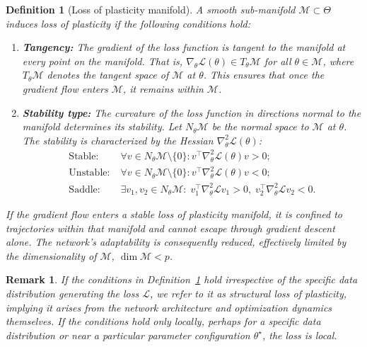 \documentclass{article}
\newcommand{\Loss}{\mathcal{L}}
\newtheorem{definition}{Definition}[section]
\newtheorem{remark}{Remark}[section]
\begin{document}
\begin{definition}[Loss of plasticity manifold]
\label{def:lop}
A smooth sub-manifold $\mathcal{M}\subset\Theta$ induces loss of plasticity if the following conditions hold:
\begin{enumerate}[label=(\alph*)]
    \item \textbf{Tangency:} The gradient of the loss function is tangent to the manifold at every point on the manifold. That is, $\nabla_\theta\Loss(\theta)\in T_\theta\mathcal{M}$ for all $\theta\in\mathcal{M}$, where $T_\theta\mathcal{M}$ denotes the tangent space of $\mathcal{M}$ at $\theta$. This ensures that once the gradient flow enters $\mathcal{M}$, it remains within $\mathcal{M}$.
    \item \textbf{Stability type:} The curvature of the loss function in directions normal to the manifold determines its stability. Let $N_\theta\mathcal{M}$ be the normal space to $\mathcal{M}$ at $\theta$. The stability is characterized by the Hessian $\nabla_\theta^2\Loss(\theta)$: \vspace{-4pt}
        \begin{align}
        \text{Stable:}\; &\forall v\in N_\theta\mathcal{M}\setminus\{0\}: v^\top\nabla_\theta^2\Loss(\theta)v > 0; \label{eq:stable}\\
        \text{Unstable:}\; &\forall v\in N_\theta\mathcal{M}\setminus\{0\}: v^\top\nabla_\theta^2\Loss(\theta)v < 0; \label{eq:unstable}\\
        \text{Saddle:}\; &\exists v_1,v_2\in N_\theta\mathcal{M}:\; v_1^\top\nabla_\theta^2\Loss v_1>0,\; v_2^\top\nabla_\theta^2\Loss v_2<0. \label{eq:saddle}
        \end{align}
\end{enumerate}
If the gradient flow enters a \emph{stable} loss of plasticity manifold, it is confined to trajectories within that manifold and cannot escape through gradient descent alone. The network's adaptability is consequently reduced, effectively limited by the dimensionality of $\mathcal{M}$, $\dim\mathcal{M} < p$.
\end{definition}

\begin{remark}
If the conditions in Definition~\ref{def:lop} hold irrespective of the specific data distribution generating the loss $\Loss$, we refer to it as structural loss of plasticity, implying it arises from the network architecture and optimization dynamics themselves. If the conditions hold only locally, perhaps for a specific data distribution or near a particular parameter configuration $\theta^\star$, the loss is local.
\end{remark}
\end{document}

